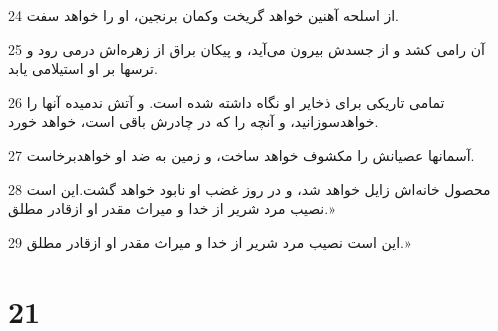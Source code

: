 \par 24 از اسلحه آهنین خواهد گریخت وکمان برنجین، او را خواهد سفت.
\par 25 آن رامی کشد و از جسدش بیرون می‌آید، و پیکان براق از زهره‌اش درمی رود و ترسها بر او استیلامی یابد.
\par 26 تمامی تاریکی برای ذخایر او نگاه داشته شده است. و آتش ندمیده آنها را خواهدسوزانید، و آنچه را که در چادرش باقی است، خواهد خورد.
\par 27 آسمانها عصیانش را مکشوف خواهد ساخت، و زمین به ضد او خواهدبرخاست.
\par 28 محصول خانه‌اش زایل خواهد شد، و در روز غضب او نابود خواهد گشت.این است نصیب مرد شریر از خدا و میراث مقدر او ازقادر مطلق.»
\par 29 این است نصیب مرد شریر از خدا و میراث مقدر او ازقادر مطلق.»
 
\chapter{21}

